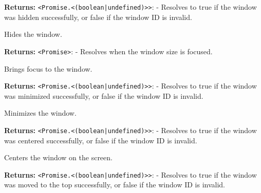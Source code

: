 \documentclass[12pt,a4paper]{article}
\begin{document}
\vspace{5mm}
\noindent {}


\noindent \textbf{Returns:} \texttt{<Promise.<(boolean|undefined)>>}: - Resolves to \textasciigrave{}true\textasciigrave{} if the window was hidden successfully, or \textasciigrave{}false\textasciigrave{} if the window ID is invalid.

\noindent Hides the window.

\vspace{5mm}
\noindent {}


\noindent \textbf{Returns:} \texttt{<Promise>}: - Resolves when the window size is focused.

\noindent Brings focus to the window.

\vspace{5mm}
\noindent {}


\noindent \textbf{Returns:} \texttt{<Promise.<(boolean|undefined)>>}: - Resolves to \textasciigrave{}true\textasciigrave{} if the window was minimized successfully, or \textasciigrave{}false\textasciigrave{} if the window ID is invalid.

\noindent Minimizes the window.

\vspace{5mm}
\noindent {}


\noindent \textbf{Returns:} \texttt{<Promise.<(boolean|undefined)>>}: - Resolves to \textasciigrave{}true\textasciigrave{} if the window was centered successfully, or \textasciigrave{}false\textasciigrave{} if the window ID is invalid.

\noindent Centers the window on the screen.

\vspace{5mm}
\noindent {}


\noindent \textbf{Returns:} \texttt{<Promise.<(boolean|undefined)>>}: - Resolves to \textasciigrave{}true\textasciigrave{} if the window was moved to the top successfully, or \textasciigrave{}false\textasciigrave{} if the window ID is invalid.
\end{document}
